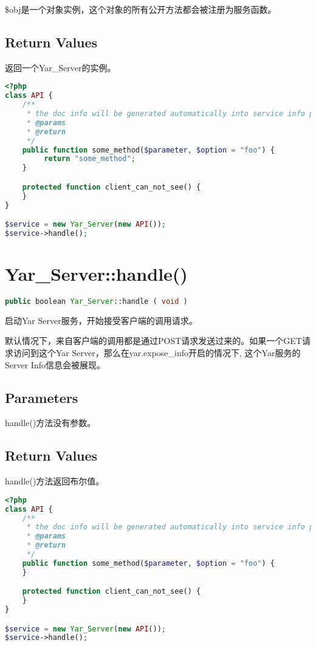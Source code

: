 \begin{compactitem}
\item \$obj是一个对象实例，这个对象的所有公开方法都会被注册为服务函数。
\end{compactitem}



\subsection{Return Values}

返回一个Yar\_Server的实例。 

\begin{lstlisting}[language=PHP]
<?php
class API {
    /**
     * the doc info will be generated automatically into service info page.
     * @params 
     * @return
     */
    public function some_method($parameter, $option = "foo") {
         return "some_method";
    }

    protected function client_can_not_see() {
    }
}

$service = new Yar_Server(new API());
$service->handle();
\end{lstlisting}


\section{Yar\_Server::handle()}


\begin{lstlisting}[language=PHP]
public boolean Yar_Server::handle ( void )
\end{lstlisting}

启动Yar Server服务，开始接受客户端的调用请求。

默认情况下，来自客户端的调用都是通过POST请求发送过来的。如果一个GET请求访问到这个Yar Server，那么在yar.expose\_info开启的情况下, 这个Yar服务的Server Info信息会被展现。

\subsection{Parameters}

handle()方法没有参数。

\subsection{Return Values}

handle()方法返回布尔值。


\begin{lstlisting}[language=PHP]
<?php
class API {
    /**
     * the doc info will be generated automatically into service info page.
     * @params 
     * @return
     */
    public function some_method($parameter, $option = "foo") {
    }

    protected function client_can_not_see() {
    }
}

$service = new Yar_Server(new API());
$service->handle();
\end{lstlisting}


